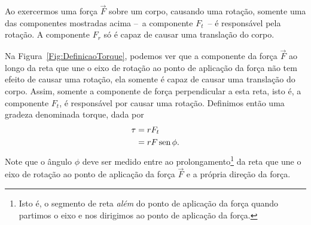 \begin{marginfigure}
\centering
{}
\caption{Ao exercermos uma força $\vec{F}$ sobre um corpo, causando uma rotação, somente uma das componentes mostradas acima --~a componente $F_t$~-- é responsável pela rotação. A componente $F_r$ só é capaz de causar uma translação do corpo. \label{Fig:DefinicaoTorque}}
\end{marginfigure}

Na Figura~\ref{Fig:DefinicaoTorque}, podemos ver que a componente da força $\vec{F}$ ao longo da reta que une o eixo de rotação ao ponto de aplicação da força não tem efeito de causar uma rotação, ela somente é capaz de causar uma translação do corpo. Assim, somente a componente de força perpendicular a esta reta, isto é, a componente $F_t$, é responsável por causar uma rotação. Definimos então uma gradeza denominada torque, dada por
\begin{align}\label{Eq:DefModTorque}
	\tau &= r F_t \\
	&= r F \operatorname{sen}\phi.
\end{align}
%
Note que o ângulo $\phi$ deve ser medido entre ao prolongamento\footnote{Isto é, o segmento de reta \emph{além} do ponto de aplicação da força quando partimos o eixo e nos dirigimos ao ponto de aplicação da força.} da reta que une o eixo de rotação ao ponto de aplicação da força $\vec{F}$ e a própria direção da força.

